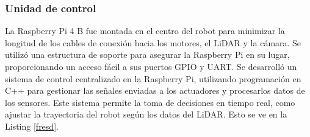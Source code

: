     \subsubsection{Unidad de control}
    La Raspberry Pi 4 B fue montada en el centro del robot para minimizar la longitud de
        los cables de conexi\'on hacia los motores, el LiDAR y la c\'amara. Se utiliz\'o una
        estructura de soporte para asegurar la Raspberry Pi en su lugar, proporcionando un
        acceso f\'acil a sus puertos GPIO y UART.
    \vskip 0.5cm
    Se desarroll\'o un sistema de control centralizado en la Raspberry Pi, utilizando
        programaci\'on en C++ para gestionar las se\~nales enviadas a los actuadores y procesarlos datos de los sensores. Este sistema permite la toma de decisiones en tiempo real,
        como ajustar la trayectoria del robot seg\'un los datos del LiDAR. Esto se ve en la Listing \ref{fresd}.
    \vskip 0.5cm
